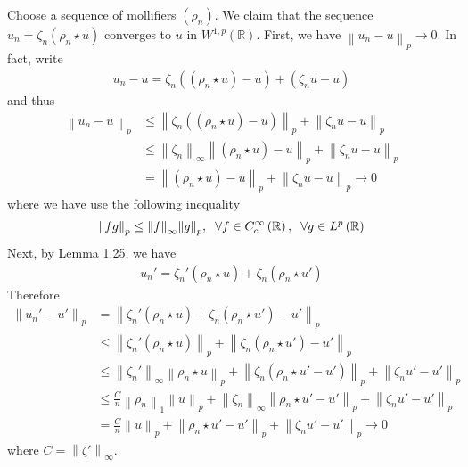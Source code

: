 \documentclass[a4paper,oneside]{article}
\numberwithin{equation}{section}
\begin{document}
Choose a sequence of mollifiers $\left(\rho _n\right)$. We claim that the sequence ${u_n} = {\zeta _n}\left( {{\rho _n}\star u} \right)$ converges to $u$ in $W^{1,p}\left(\mathbb{R}\right)$. First, we have ${\left\| {{u_n} - u} \right\|_p} \to 0$. In fact, write
\begin{align}
{u_n} - u = {\zeta _n}\left( {\left( {{\rho _n}\star u} \right) - u} \right) + \left( {{\zeta _n}u - u} \right)
\end{align}
and thus
\begin{align}
\label{1.244}
{\left\| {{u_n} - u} \right\|_p} &\le {\left\| {{\zeta _n}\left( {\left( {{\rho _n}\star u} \right) - u} \right)} \right\|_p} + {\left\| {{\zeta _n}u - u} \right\|_p}\\
& \le {\left\| {{\zeta _n}} \right\|_{\infty}}{\left\| {\left( {{\rho _n}\star u} \right) - u} \right\|_p} + {\left\| {{\zeta _n}u - u} \right\|_p}\\
& = {\left\| {\left( {{\rho _n}\star u} \right) - u} \right\|_p} + {\left\| {{\zeta _n}u - u} \right\|_p} \to 0 \label{1.246}
\end{align}
where we have use the following inequality
\begin{align}
{\left\| {fg} \right\|_p} \le {\left\| f \right\|_\infty }{\left\| g \right\|_p},\hspace{0.2cm} \forall f \in C_c^\infty \left( \mathbb{R} \right),\hspace{0.2cm} \forall g \in {L^p}\left( \mathbb{R} \right)
\end{align}
Next, by Lemma 1.25, we have
\begin{align}
{u_n}' = {\zeta _n}'\left( {{\rho _n}\star u} \right) + {\zeta _n}\left( {{\rho _n}\star u'} \right)
\end{align}
Therefore
\begin{align}
\label{1.249}
{\left\| {{u_n}' - u'} \right\|_p} &= {\left\| {{\zeta _n}'\left( {{\rho _n}\star u} \right) + {\zeta _n}\left( {{\rho _n}\star u'} \right) - u'} \right\|_p}\\
& \le {\left\| {{\zeta _n}'\left( {{\rho _n}\star u} \right)} \right\|_p} + {\left\| {{\zeta _n}\left( {{\rho _n}\star u'} \right) - u'} \right\|_p}\\
& \le {\left\| {{\zeta _n}'} \right\|_\infty }{\left\| {{\rho _n}\star u} \right\|_p} + {\left\| {{\zeta _n}\left( {{\rho _n}\star u' - u'} \right)} \right\|_p} + {\left\| {{\zeta _n}u' - u'} \right\|_p}\\
& \le \frac{C}{n}{\left\| {{\rho _n}} \right\|_1}{\left\| u \right\|_p} + {\left\| {{\zeta _n}} \right\|_\infty }{\left\| {{\rho _n}\star u' - u'} \right\|_p} + {\left\| {{\zeta _n}u' - u'} \right\|_p}\\
& = \frac{C}{n}{\left\| u \right\|_p} + {\left\| {{\rho _n}\star u' - u'} \right\|_p} + {\left\| {{\zeta _n}u' - u'} \right\|_p} \to 0 \label{1.253}
\end{align}
where $C = {\left\| {\zeta '} \right\|_\infty }$.
\end{document}
